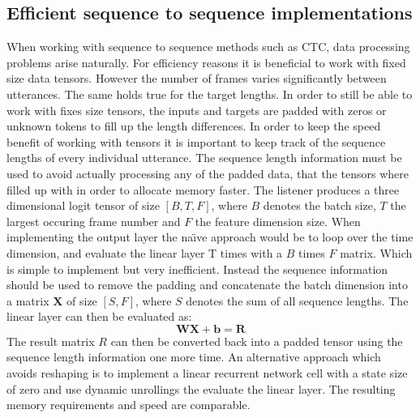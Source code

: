 \subsection{Efficient sequence to sequence implementations}
When working with sequence to sequence methods such as CTC, data processing problems arise naturally. For efficiency reasons it is beneficial to work with 
fixed size data tensors. However the number of frames varies significantly between utterances. The same holds true for the target lengths. In order to still be able to work with fixes size tensors, the inputs and targets are padded with zeros or unknown tokens to fill up the length differences. 
In order to keep the speed benefit of working with tensors it is important to
keep track of the sequence lengths of every individual utterance.
The sequence length information must be used to avoid actually processing any of the padded data, that the tensors where filled up with in order to allocate memory faster.
The listener produces a three dimensional logit tensor of size $[B, T, F]$, where $B$ denotes the batch size, $T$ the largest occuring frame number and $F$ the feature dimension size. When implementing the output layer the na\"{\i}ve approach would be to loop over the time dimension, and evaluate the linear layer T times with a $B$ times $F$ matrix. Which is simple to implement but very inefficient. Instead the sequence information should be used to remove the padding and concatenate the batch dimension into a matrix $\mathbf{X}$ of size $[S, F]$, where $S$ denotes the sum of all sequence lengths. The linear layer can then be evaluated as:
\begin{equation}
\mathbf{W}\mathbf{X} + \mathbf{b} = \mathbf{R} 
\end{equation}   
The result matrix $R$ can then be converted back into a padded tensor using the sequence length information one more time.
An alternative approach which avoids reshaping is to implement a linear recurrent network cell with a state size of zero and use dynamic unrollings the evaluate the linear layer. The resulting memory requirements and speed are comparable.


  






